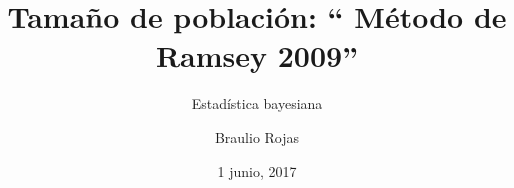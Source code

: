 \documentclass{beamer}
\title[Estimaci\'on de la tama\~no de poblaci\'on]{Tama\~no de poblaci\'on: ``
M\'etodo de Ramsey 2009''}
\subtitle{Estad\'istica bayesiana}
\author{Braulio Rojas}
\date{1 junio, 2017}
\institute{An\'alisis Cient\'ifico\\
GECI}
\begin{document}
\frame{\titlepage}

\end{document}
